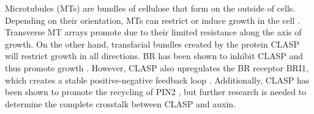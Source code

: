 \medskip

Microtubules (MTs) are bundles of cellulose that form on the outside of cells. Depending on their orientation, MTs can restrict or induce growth in the cell \cite{ambrose2011}. Transverse MT arrays promote due to their limited resistance along the axis of growth. On the other hand, transfacial bundles created by the protein CLASP will restrict growth in all directions. BR has been shown to inhibit CLASP and thus promote growth \cite{ruan2018}. However, CLASP also upregulates the BR receptor BRI1, which creates a stable positive-negative feedback loop \cite{ruan2018}. Additionally, CLASP has been shown to promote the recycling of PIN2 \cite{ambrose2013}, but further research is needed to determine the complete crosstalk between CLASP and auxin.
